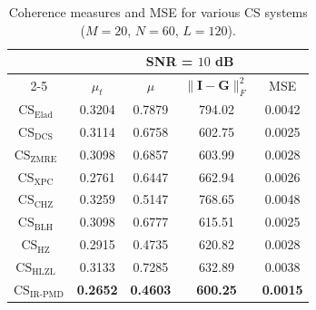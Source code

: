\begin{table}
\caption{Coherence measures and MSE for various CS systems ($M=20$, $N=60$, $L=120$).}
\label{table: MU_MSE_10}
\centering
\begin{tabular}{|c|cccc|}
\hline
\multirow{2}{*}{} & \multicolumn{4}{c|}{SNR = $10$ dB}\\ 
\cline{2-5} 
& \multicolumn{1}{c|}{$\mu_{t}$} & \multicolumn{1}{c|}{$\mu$} & \multicolumn{1}{c|}{$\|\bm{I}-\bm{G}\|_{F}^{2}$} & MSE\\ 
\hline
$\text{CS}_{\text{Elad}}$~\cite{Elad} & \multicolumn{1}{c|}{0.3204} & \multicolumn{1}{c|}{0.7879} & \multicolumn{1}{c|}{794.02} & 0.0042\\ 
\hline
$\text{CS}_{\text{DCS}}$~\cite{Sapiro} & \multicolumn{1}{c|}{0.3114} & \multicolumn{1}{c|}{0.6758} & \multicolumn{1}{c|}{602.75} & 0.0025\\ 
\hline
$\text{CS}_{\text{ZMRE}}$~\cite{Zelnik} & \multicolumn{1}{c|}{0.3098} & \multicolumn{1}{c|}{0.6857} & \multicolumn{1}{c|}{603.99} & 0.0028\\ 
\hline
$\text{CS}_{\text{XPC}}$~\cite{Xuprojection} & \multicolumn{1}{c|}{0.2761} & \multicolumn{1}{c|}{0.6447} & \multicolumn{1}{c|}{662.94} & 0.0026\\ 
\hline
$\text{CS}_{\text{CHZ}}$~\cite{CHZ} & \multicolumn{1}{c|}{0.3259} & \multicolumn{1}{c|}{0.5147} & \multicolumn{1}{c|}{768.65} & 0.0048\\ 
\hline
$\text{CS}_{\text{BLH}}$~\cite{SRE_Huang} & \multicolumn{1}{c|}{0.3098} & \multicolumn{1}{c|}{0.6777} & \multicolumn{1}{c|}{615.51} & 0.0025\\ 
\hline
$\text{CS}_{\text{HZ}}$~\cite{HONG_robust} & \multicolumn{1}{c|}{0.2915} & \multicolumn{1}{c|}{0.4735} & \multicolumn{1}{c|}{620.82} & 0.0028\\ 
\hline
$\text{CS}_{\text{HLZL}}$~\cite{HONG_sparse} & \multicolumn{1}{c|}{0.3133} & \multicolumn{1}{c|}{0.7285} & \multicolumn{1}{c|}{632.89} & 0.0038\\ 
\hline
$\text{CS}_{\text{IR-PMD}}$ & \multicolumn{1}{c|}{\textbf{0.2652}} & \multicolumn{1}{c|}{\textbf{0.4603}} & \multicolumn{1}{c|}{\textbf{600.25}} & \textbf{0.0015}\\ 
\hline
\end{tabular}
\end{table}
